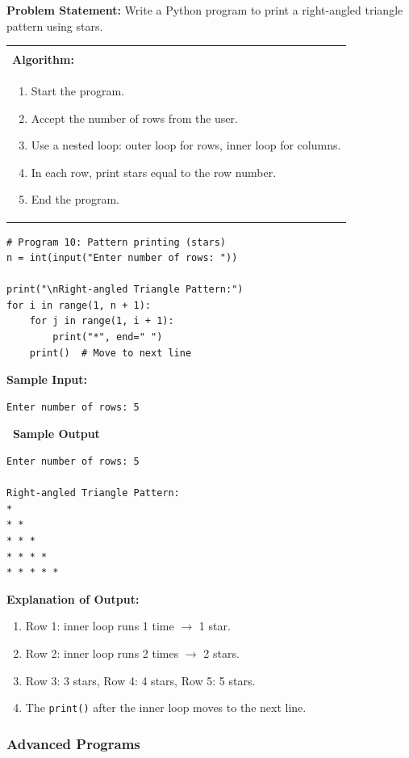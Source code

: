\documentclass[12pt,a4paper]{article}
\makeatletter
\newcommand{\outhead}{\noindent\colorbox{cmrgreen!25}%
  {\textbf{\small\color{cmrdark}~Sample Output~}}\par\vspace{-1pt}}
\newenvironment{algobox}{%
  \par\vspace{4pt}%
  \noindent\begin{tabular}{@{}p{\linewidth}@{}}%
  \hline\\[-8pt]%
  \textbf{\color{blue!60!black}\small Algorithm:}\\[2pt]%
}{%
  \\[-4pt]\hline%
  \end{tabular}\par\vspace{4pt}%
}
\makeatother
\begin{document}
\textbf{Problem Statement:}
Write a Python program to print a right-angled triangle pattern using stars.

\begin{algobox}
\begin{enumerate}[label=Step \arabic*:]
  \item Start the program.
  \item Accept the number of rows from the user.
  \item Use a nested loop: outer loop for rows, inner loop for columns.
  \item In each row, print stars equal to the row number.
  \item End the program.
\end{enumerate}
\end{algobox}

\begin{lstlisting}
# Program 10: Pattern printing (stars)
n = int(input("Enter number of rows: "))

print("\nRight-angled Triangle Pattern:")
for i in range(1, n + 1):
    for j in range(1, i + 1):
        print("*", end=" ")
    print()  # Move to next line
\end{lstlisting}

\textbf{Sample Input:}
\begin{verbatim}
Enter number of rows: 5
\end{verbatim}

\outhead
\begin{lstlisting}[style=outputstyle]
Enter number of rows: 5

Right-angled Triangle Pattern:
*
* *
* * *
* * * *
* * * * *
\end{lstlisting}

\textbf{Explanation of Output:}
\begin{enumerate}
  \item Row 1: inner loop runs 1 time $\to$ 1 star.
  \item Row 2: inner loop runs 2 times $\to$ 2 stars.
  \item Row 3: 3 stars, Row 4: 4 stars, Row 5: 5 stars.
  \item The \texttt{print()} after the inner loop moves to the next line.
\end{enumerate}

\subsubsection{Advanced Programs}
\end{document}
